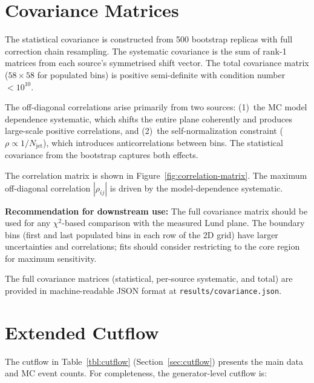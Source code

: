 \documentclass[11pt,a4paper]{article}
\begin{document}
\section{Covariance Matrices}
\label{app:covariance}

The statistical covariance is constructed from 500 bootstrap replicas
with full correction chain resampling.  The systematic covariance is
the sum of rank-1 matrices from each source's symmetrised shift vector.
The total covariance matrix ($58 \times 58$ for populated bins) is
positive semi-definite with condition number $< 10^{10}$.

The off-diagonal correlations arise primarily from two sources:
(1)~the MC model dependence systematic, which shifts the entire plane
coherently and produces large-scale positive correlations, and
(2)~the self-normalization constraint ($\rho \propto 1/N_\text{jet}$),
which introduces anticorrelations between bins.  The statistical
covariance from the bootstrap captures both effects.

The correlation matrix is shown in Figure~\ref{fig:correlation-matrix}.
The maximum off-diagonal correlation $|\rho_{ij}|$ is driven by the
model-dependence systematic.

\textbf{Recommendation for downstream use:} The full covariance matrix
should be used for any $\chi^2$-based comparison with the measured
Lund plane.  The boundary bins (first and last populated bins in each
row of the 2D grid) have larger uncertainties and correlations; fits
should consider restricting to the core region for maximum sensitivity.

The full covariance matrices (statistical, per-source systematic, and
total) are provided in machine-readable JSON format at
\texttt{results/covariance.json}.

\section{Extended Cutflow}
\label{app:cutflow}

The cutflow in Table~\ref{tbl:cutflow} (Section~\ref{sec:cutflow})
presents the main data and MC event counts.  For completeness, the
generator-level cutflow is:
\end{document}
